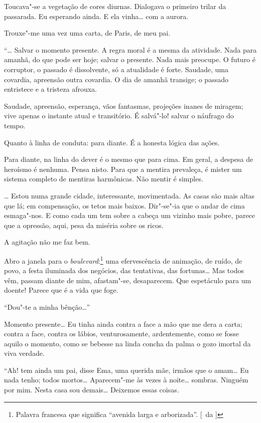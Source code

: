 Toucava"-se a vegetação de cores diurnas. Dialogava o primeiro trilar da passarada.
Eu esperando ainda. E ela vinha\ldots{} com a aurora. 

Trouxe"-me uma vez uma carta, de Paris, de meu pai. 

``\ldots{} Salvar o momento presente. A regra moral é a
mesma da atividade. Nada para amanhã, do que pode ser hoje; salvar o
presente. Nada mais preocupe. O futuro é corruptor, o passado é
dissolvente, só a atualidade é forte. Saudade, uma covardia, apreensão
outra covardia. O dia de amanhã transige; o passado entristece e a
tristeza afrouxa. 

Saudade, apreensão, esperança, vãos fantasmas,
projeções inanes de miragem; vive apenas o instante atual e
transitório. É salvá"-lo! salvar o náufrago do tempo. 

Quanto à linha de conduta: para diante. É a honesta lógica das ações. 

Para diante, na
linha do dever é o mesmo que para cima. Em geral, a despesa de heroísmo
é nenhuma. Pensa nisto. Para que a mentira prevaleça, é mister um
sistema completo de mentiras harmônicas. Não mentir é simples. 

\ldots{} Estou numa grande cidade, interessante, movimentada. As casas são mais 
altas que lá; em compensação, os tetos mais baixos. Dir"-se"-ia que o andar
de cima esmaga"-nos. E como cada um tem sobre a cabeça um vizinho mais
pobre, parece que a opressão, aqui, pesa da miséria sobre os ricos. 

A agitação não me faz bem. 

Abro a janela para o \textit{boulevard}:\footnote{ Palavra francesa que significa 
``avenida larga e arborizada''. [~da ]} uma
efervescência de animação, de ruído, de povo, a festa iluminada dos
negócios, das tentativas, das fortunas\ldots{} Mas todos vêm, passam diante
de mim, afastam"-se, desaparecem. Que espetáculo para um doente!
Parece que é a vida que foge. 

``Dou"-te a minha bênção\ldots{}'' 

Momento presente\ldots{} Eu tinha ainda contra a face a mão que me dera a carta;
contra a face, contra os lábios, venturosamente, ardentemente, como se
fosse aquilo o momento, como se bebesse na linda concha da palma o gozo
imortal da viva verdade. 

``Ah! tem ainda um pai, disse Ema, uma querida
mãe, irmãos que o amam\ldots{} Eu nada tenho; todos mortos\ldots{} Aparecem"-me
às vezes à noite\ldots{} sombras. Ninguém por mim. Nesta casa sou demais\ldots{}
Deixemos essas coisas. 

